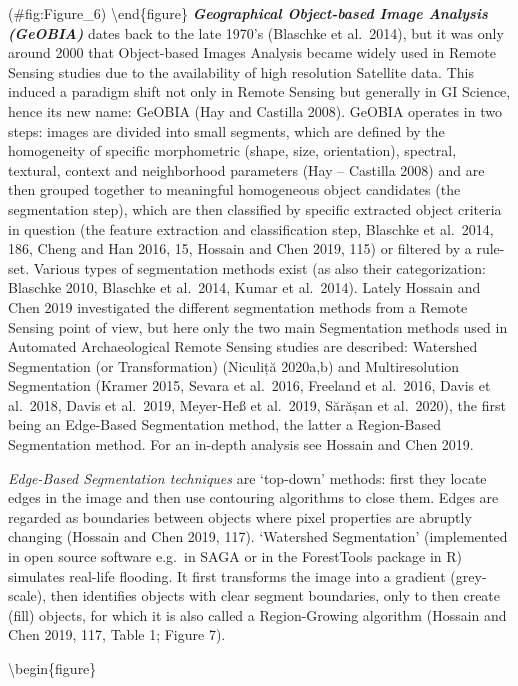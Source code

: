 \documentclass[
]{article}
\begin{document}
(\#fig:Figure\_6)
\textbackslash end\{figure\}
\textbf{\emph{Geographical Object-based Image Analysis (GeOBIA)}} dates back to the late 1970's (Blaschke et al.~2014), but it was only around 2000 that Object-based Images Analysis became widely used in Remote Sensing studies due to the availability of high resolution Satellite data. This induced a paradigm shift not only in Remote Sensing but generally in GI Science, hence its new name: GeOBIA (Hay and Castilla 2008). GeOBIA operates in two steps: images are divided into small segments, which are defined by the homogeneity of specific morphometric (shape, size, orientation), spectral, textural, context and neighborhood parameters (Hay -- Castilla 2008) and are then grouped together to meaningful homogeneous object candidates (the segmentation step), which are then classified by specific extracted object criteria in question (the feature extraction and classification step, Blaschke et al.~2014, 186, Cheng and Han 2016, 15, Hossain and Chen 2019, 115) or filtered by a rule-set. Various types of segmentation methods exist (as also their categorization: Blaschke 2010, Blaschke et al.~2014, Kumar et al.~2014). Lately Hossain and Chen 2019 investigated the different segmentation methods from a Remote Sensing point of view, but here only the two main Segmentation methods used in Automated Archaeological Remote Sensing studies are described: Watershed Segmentation (or Transformation) (Niculiță 2020a,b) and Multiresolution Segmentation (Kramer 2015, Sevara et al.~2016, Freeland et al.~2016, Davis et al.~2018, Davis et al.~2019, Meyer-Heß et al.~2019, Sărășan et al.~2020), the first being an Edge-Based Segmentation method, the latter a Region-Based Segmentation method. For an in-depth analysis see Hossain and Chen 2019.

\emph{Edge-Based Segmentation techniques} are `top-down' methods: first they locate edges in the image and then use contouring algorithms to close them. Edges are regarded as boundaries between objects where pixel properties are abruptly changing (Hossain and Chen 2019, 117). `Watershed Segmentation' (implemented in open source software e.g.~in SAGA or in the ForestTools package in R) simulates real-life flooding. It first transforms the image into a gradient (grey-scale), then identifies objects with clear segment boundaries, only to then create (fill) objects, for which it is also called a Region-Growing algorithm (Hossain and Chen 2019, 117, Table 1; Figure 7).

\textbackslash begin\{figure\}
\end{document}
